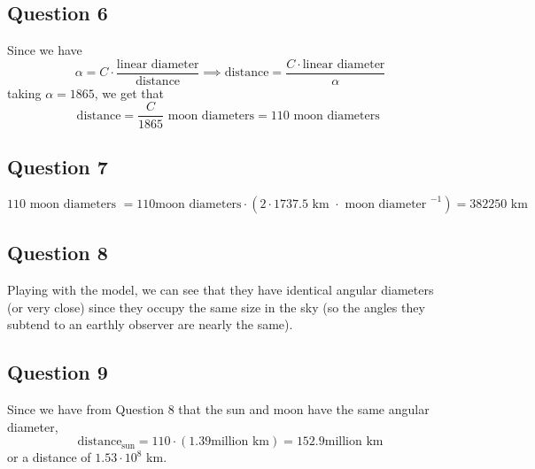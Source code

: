 \documentclass[12pt,letterpaper]{article}
\theoremstyle{definition}
\begin{document}
\subsection*{Question 6}

Since we have
\[
  \alpha = C \cdot \frac{\text{linear diameter}}{\text{distance}} \implies \text{distance} = \frac{C \cdot \text{linear diameter}}{\alpha}
\]
taking $\alpha = 1865$, we get that
\[
  \text{distance} = \frac{C}{1865} \text{ moon diameters} = 110 \text{ moon diameters }
\]

\subsection*{Question 7}

\[
  110 \text{ moon diameters } = 110 \text{moon diameters} \cdot \left(2 \cdot 1737.5 \text{ km } \cdot \text{ moon diameter }^{-1}\right) = 382250 \text{ km }
\]

\subsection*{Question 8}

Playing with the model, we can see that they have identical angular diameters (or very close) since they occupy the same size in the sky (so the angles they subtend to an earthly observer are nearly the same).

\subsection*{Question 9}

Since we have from Question 8 that the sun and moon have the same angular diameter,
\[
  \text{distance}_{\text{sun}} = 110 \cdot (1.39 \text{million km}) = 152.9 \text{million km}
\]
or a distance of $1.53 \cdot 10^{8}$ km.
\end{document}
